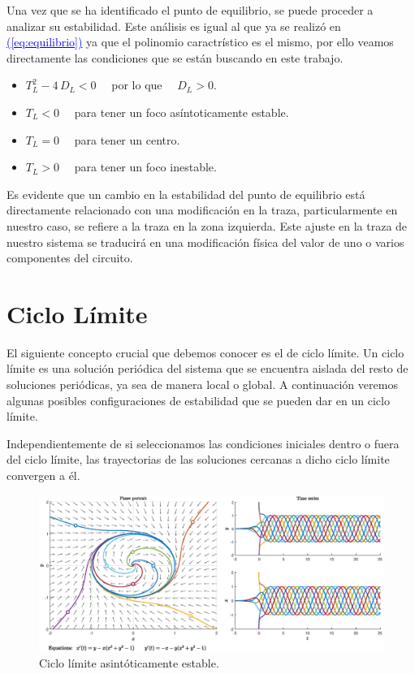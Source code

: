\documentclass[12pt,a4paper]{report} %
\newcommand{\eref}[1]{\hyperref[#1]{\textcolor{blue}{(\ref*{#1})}}}
\begin{document}
\newpage
		
		 Una vez que se ha identificado el punto de equilibrio, se puede proceder a analizar su estabilidad. Este análisis es igual al que ya se realizó en \eref{eq:equilibrio} ya que el polinomio caractrístico es el mismo, por ello veamos directamente las condiciones que se están buscando en este trabajo.
		 
		\vspace{0.2cm}\begin{itemize}
			\item $T_L^2-4\,D_L<0\quad$ por lo que $\quad D_L>0$.
			\item $T_L<0\quad$ para tener un foco asíntoticamente estable.
			\item $T_L=0\quad$ para tener un centro.
			\item $T_L>0\quad$ para tener un foco inestable.
		\end{itemize}\smallskip
		
		\vspace{0.5cm}Es evidente que un cambio en la estabilidad del punto de equilibrio está directamente relacionado con una modificación en la traza, particularmente en nuestro caso, se refiere a la traza en la zona izquierda. Este ajuste en la traza de nuestro sistema se traducirá en una modificación física del valor de uno o varios componentes del circuito.
		
		\section{Ciclo Límite}
		
		El siguiente concepto crucial que debemos conocer es el de ciclo límite. Un ciclo límite es una solución periódica del sistema que se encuentra aislada del resto de soluciones periódicas, ya sea de manera local o global. A continuación veremos algunas posibles configuraciones de estabilidad que se pueden dar en un ciclo límite.
		
		\newpage
		
		
		\vspace{0.5cm}Independientemente de si seleccionamos las condiciones iniciales dentro o fuera del ciclo límite, las trayectorias de las soluciones cercanas a dicho ciclo límite convergen a él.
		
		\begin{figure}[h]
			\centering
			\includegraphics[width=1\textwidth]{cle.eps}
			\caption{Ciclo límite asintóticamente estable.}
			\label{fig:cle}
		\end{figure}\smallskip
		
\end{document}
